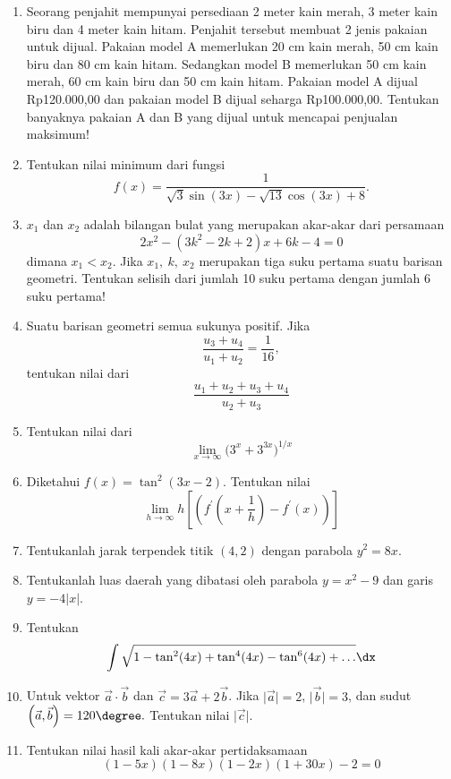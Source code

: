 \begin{enumerate}
\item Seorang penjahit mempunyai persediaan 2 meter kain merah, 3 meter kain biru dan 4 meter kain hitam. Penjahit tersebut membuat 2 jenis pakaian untuk dijual. Pakaian model A memerlukan 20 cm kain merah, 50 cm kain biru dan 80 cm kain hitam.  Sedangkan model B memerlukan 50 cm kain merah, 60 cm kain biru dan 50 cm kain hitam. Pakaian model A dijual Rp120.000,00 dan pakaian model B dijual seharga Rp100.000,00. Tentukan banyaknya pakaian A dan B yang dijual untuk mencapai penjualan maksimum!

\item Tentukan nilai minimum dari fungsi \[f(x) = \frac{1}{\sqrt{3}\sin(3x) - \sqrt{13}\cos(3x)+8}.\]

\item $x_1$ dan $x_2$ adalah bilangan bulat yang merupakan akar-akar dari persamaan \[2x^2 - (3k^2-2k+2)x + 6k-4 = 0\] dimana $x_1<x_2$. Jika $x_1,\ k,\ x_2$ merupakan tiga suku pertama suatu barisan geometri. Tentukan selisih dari jumlah 10 suku pertama dengan jumlah 6 suku pertama!

\item Suatu barisan geometri semua sukunya positif. Jika \[\frac{u_3+u_4}{u_1+u_2} = \frac{1}{16},\] tentukan nilai dari \[\frac{u_1+u_2+u_3+u_4}{u_2+u_3}\]

\item Tentukan nilai dari \[\lim_{x\to\infty}\bigl(3^x + 3^{3x}\bigr)^{1/x}\]

\item Diketahui $f(x) = \tan^2(3x-2)$. Tentukan nilai \[\lim_{h\to\infty}h\left[\left(f^\prime\left(x+\frac{1}{h}\right)-f^\prime(x)\right)\right]\]

\item Tentukanlah jarak terpendek titik $(4,2)$ dengan parabola $y^2=8x$.

\item Tentukanlah luas daerah yang dibatasi oleh parabola $y=x^2-9$ dan garis $y=-4\lvert x\rvert$.

\item Tentukan $$\int \sqrt{1-\tan^2(4x)+\tan^{4}(4x)-\tan^6(4x)+\ldots}\dx$$

\item Untuk vektor $\vec{a}\cdot\vec{b}$ dan $\vec{c} = 3\vec{a}+2\vec{b}$. Jika $\lvert\vec{a}\rvert = 2$, $\lvert\vec{b}\rvert = 3$, dan sudut $\left(\vec{a},\vec{b}\right) = 120\degree.$ Tentukan nilai $\lvert\vec{c}\rvert$.

\item Tentukan nilai hasil kali akar-akar pertidaksamaan \[(1-5x)(1-8x)(1-2x)(1+30x) - 2 = 0\]


\end{enumerate}
